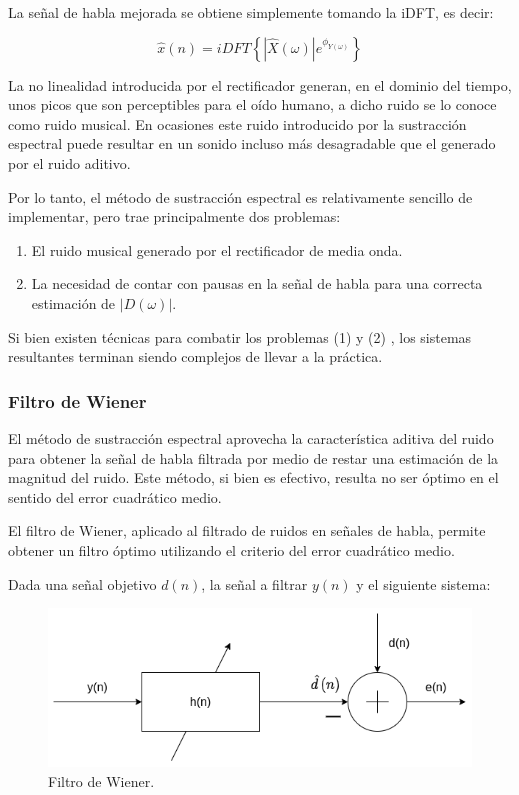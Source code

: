 La señal de habla mejorada se obtiene simplemente tomando la iDFT, es decir:

\begin{equation*}
	\hat{x}(n) = iDFT \left\{ |\hat{X}(\omega)| e^{\phi_{Y(\omega)}} \right\}
\end{equation*}

La no linealidad introducida por el rectificador generan, en el dominio del tiempo, unos picos que son perceptibles para el oído humano, a dicho ruido se lo conoce como ruido musical. En ocasiones este ruido introducido por la sustracción espectral puede resultar en un sonido incluso más desagradable que el generado por el ruido aditivo.

Por lo tanto, el método de sustracción espectral es relativamente sencillo de implementar, pero trae principalmente dos problemas:

\begin{enumerate}
	\item El ruido musical generado por el rectificador de media onda.
	\item La necesidad de contar con pausas en la señal de habla para una correcta estimación de $|D(\omega)|$.
\end{enumerate}

Si bien existen técnicas para combatir los problemas (1) y (2) \cite{speech_enhancement_theory_and_practice}, los sistemas resultantes terminan siendo complejos de llevar a la práctica.

\subsubsection{Filtro de Wiener}

El método de sustracción espectral aprovecha la característica aditiva del ruido para obtener la señal de habla filtrada por medio de restar una estimación de la magnitud del ruido. Este método, si bien es efectivo, resulta no ser óptimo en el sentido del error cuadrático medio. 

El filtro de Wiener, aplicado al filtrado de ruidos en señales de habla, permite obtener un filtro óptimo utilizando el criterio del error cuadrático medio. 

Dada una señal objetivo $d(n)$, la señal a filtrar $y(n)$ y el siguiente sistema:


\begin{figure}[H]
	\centering
	\centerline{\includegraphics[scale=0.6]{images/ch3/wiener.png}}
	\caption{Filtro de Wiener.}
	\label{fig:ch3_wiener_filter}
\end{figure}


